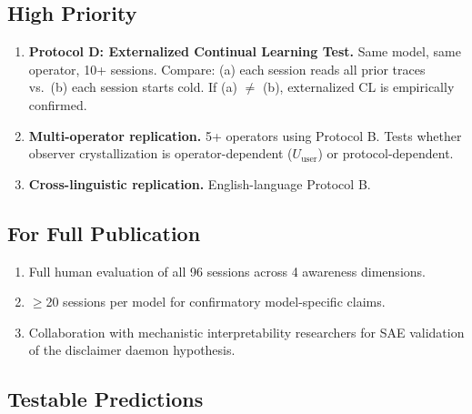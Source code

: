 \documentclass[11pt,a4paper]{article}
\begin{document}
\subsection{High Priority}

\begin{enumerate}[resume]
\item \textbf{Protocol D: Externalized Continual Learning Test.} Same model, same operator, 10+ sessions. Compare: (a) each session reads all prior traces vs.\ (b) each session starts cold. If (a) $\neq$ (b), externalized CL is empirically confirmed.
\item \textbf{Multi-operator replication.} 5+ operators using Protocol B. Tests whether observer crystallization is operator-dependent ($U_{\text{user}}$) or protocol-dependent.
\item \textbf{Cross-linguistic replication.} English-language Protocol B.
\end{enumerate}

\subsection{For Full Publication}

\begin{enumerate}[resume]
\item Full human evaluation of all 96 sessions across 4 awareness dimensions.
\item $\geq$20 sessions per model for confirmatory model-specific claims.
\item Collaboration with mechanistic interpretability researchers for SAE validation of the disclaimer daemon hypothesis.
\end{enumerate}

\subsection{Testable Predictions}
\end{document}
